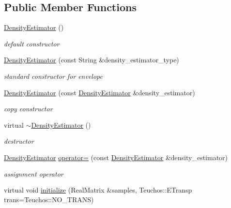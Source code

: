 \subsection*{Public Member Functions}
\begin{DoxyCompactItemize}
\item 
\hyperlink{classPecos_1_1DensityEstimator_a61d0043dfffa80f94cd77081f32be52d}{Density\+Estimator} ()
\begin{DoxyCompactList}\small\item\em default constructor \end{DoxyCompactList}\item 
\hyperlink{classPecos_1_1DensityEstimator_a0e6d09871df9b3ababad33371d95cefb}{Density\+Estimator} (const String \&density\+\_\+estimator\+\_\+type)
\begin{DoxyCompactList}\small\item\em standard constructor for envelope \end{DoxyCompactList}\item 
\hyperlink{classPecos_1_1DensityEstimator_acc375bcd034112a7c9b2e6b745ef8137}{Density\+Estimator} (const \hyperlink{classPecos_1_1DensityEstimator}{Density\+Estimator} \&density\+\_\+estimator)
\begin{DoxyCompactList}\small\item\em copy constructor \end{DoxyCompactList}\item 
virtual \hyperlink{classPecos_1_1DensityEstimator_a18e1bc50e0cf55f28ee89cd99a455798}{$\sim$\+Density\+Estimator} ()
\begin{DoxyCompactList}\small\item\em destructor \end{DoxyCompactList}\item 
\hyperlink{classPecos_1_1DensityEstimator}{Density\+Estimator} \hyperlink{classPecos_1_1DensityEstimator_a3f5714fb35670202d9f015a31a85138d}{operator=} (const \hyperlink{classPecos_1_1DensityEstimator}{Density\+Estimator} \&density\+\_\+estimator)
\begin{DoxyCompactList}\small\item\em assignment operator \end{DoxyCompactList}\item 
virtual void \hyperlink{classPecos_1_1DensityEstimator_a6c7e188a789efc33dbeb356f6e200c33}{initialize} (Real\+Matrix \&samples, Teuchos\+::\+E\+Transp trans=Teuchos\+::\+N\+O\+\_\+\+T\+R\+A\+NS)\label{classPecos_1_1DensityEstimator_a6c7e188a789efc33dbeb356f6e200c33}


\end{DoxyCompactItemize}
